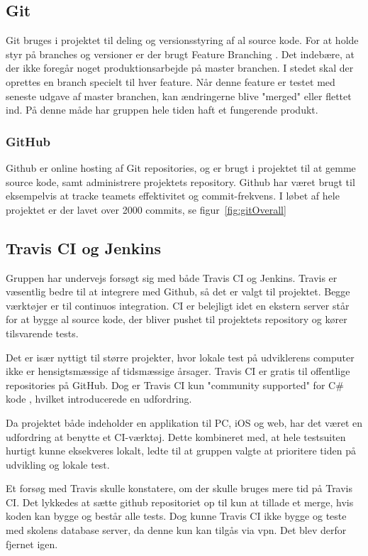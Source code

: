 \subsection{Git}
Git bruges i projektet til deling og versionsstyring af al source kode.
For at holde styr på branches og versioner er der brugt Feature Branching \cite{atlassian2016}. Det indebære, at der ikke foregår noget produktionsarbejde på master branchen. I stedet skal der oprettes en branch specielt til hver feature. Når denne feature er testet med seneste udgave af master branchen, kan ændringerne blive "merged" eller flettet ind. På denne måde har gruppen hele tiden haft et fungerende produkt.

\subsubsection{GitHub}
Github er online hosting af Git repositories, og er brugt i projektet til at gemme source kode, samt administrere projektets repository. Github har været brugt til eksempelvis at tracke teamets effektivitet og commit-frekvens. I løbet af hele projektet er der lavet over 2000 commits, se figur~\ref{fig:gitOverall}

\subsection{Travis CI og Jenkins} 
Gruppen har undervejs forsøgt sig med både Travis CI og Jenkins. Travis er væsentlig bedre til at integrere med Github, så det er valgt til projektet.
Begge værktøjer er til continuos integration. CI er belejligt idet en ekstern server står for at bygge al source kode, der bliver pushet til projektets repository og kører tilsvarende tests.

Det er især nyttigt til større projekter, hvor lokale test på udviklerens computer ikke er hensigtsmæssige af tidsmæssige årsager. Travis CI er gratis til offentlige repositories på GitHub. Dog er Travis CI kun "community supported" for C\# kode \cite{communitysupportedlanguages2016}, hvilket introducerede en udfordring.

Da projektet både indeholder en applikation til PC, iOS og web, har det været en udfordring at benytte et CI-værktøj. Dette kombineret med, at hele testsuiten hurtigt kunne eksekveres lokalt, ledte til at gruppen valgte at prioritere tiden på udvikling og lokale test.

Et forsøg med Travis skulle konstatere, om der skulle bruges mere tid på Travis CI. Det lykkedes at sætte github repositoriet op til kun at tillade et merge, hvis koden kan bygge og består alle tests. Dog kunne Travis CI ikke bygge og teste med skolens database server, da denne kun kan tilgås via vpn. Det blev derfor fjernet igen.

